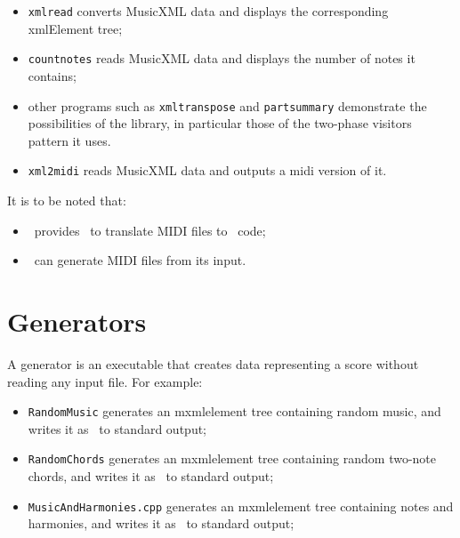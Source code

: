 \documentclass[12pt,a4paper]{article}
\begin{document}
\begin{itemize}
\item {\tt xmlread} converts MusicXML data and displays the corresponding xmlElement tree;

\item {\tt countnotes} reads MusicXML data and displays the number of notes it contains;

\item other programs such as {\tt xmltranspose} and {\tt partsummary} demonstrate the possibilities of the library, in particular those of the two-phase visitors pattern it uses.

\item {\tt xml2midi} reads MusicXML data and outputs a midi version of it.
\end{itemize}

It is to be noted that:
\begin{itemize}
\item \lily\ provides \midiToLy\ to translate MIDI files to \lily\ code;
\item \lily\ can generate MIDI files from its input.
\end{itemize} 


\section{Generators}

A generator is an executable that creates data representing a score without reading any input file.
For example:
\begin{itemize}
\item \texttt{RandomMusic} generates an mxmlelement tree containing random music, and writes it as \mxml\ to standard output;

\item \texttt{RandomChords} generates an mxmlelement tree containing random two-note chords, and writes it as \mxml\ to standard output;

\item \texttt{MusicAndHarmonies.cpp} generates an mxmlelement tree containing notes and harmonies, and writes it as \mxml\ to standard output;
\end{itemize}


\newpage

\end{document}
